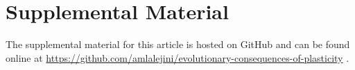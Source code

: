 

\section*{Supplemental Material}

The supplemental material for this article is hosted on GitHub and can be found online at \url{https://github.com/amlalejini/evolutionary-consequences-of-plasticity} \citep{supplemental_material}.
 